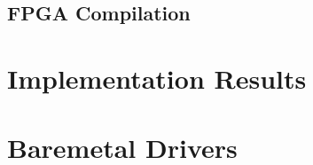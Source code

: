 \documentclass{ug}
\begin{document}
\ifdefined\FPGACOMP
\subsection{FPGA Compilation}
\label{sec:fpga}

\fi

\ifdefined\RESULTS
\ifdefined\SECTIONCLEARPAGE
\clearpage
\fi
\section{Implementation Results}
\label{sec:results}

\fi

\ifdefined\DOXYGEN
\section{Baremetal Drivers}
\label{sec:baremetal}

\fi

\ifdefined\CUSTOM

\fi
\end{document}
